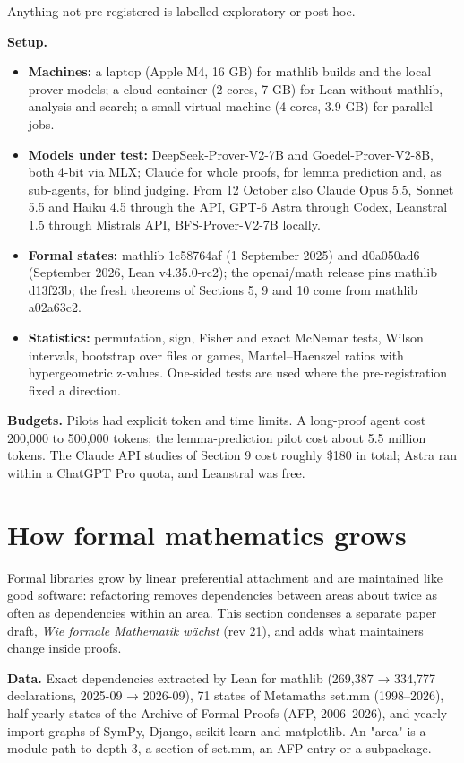 \documentclass[11pt,a4paper]{article}
\providecommand{\tightlist}{\setlength{\itemsep}{0pt}\setlength{\parskip}{0pt}}
\begin{document}
Anything not pre-registered is labelled exploratory or post hoc.

\textbf{Setup.}

\begin{itemize}
\tightlist
\item
  \textbf{Machines:} a laptop (Apple M4, 16 GB) for mathlib builds and the local prover models; a cloud container (2 cores, 7 GB) for Lean without mathlib, analysis and search; a small virtual machine (4 cores, 3.9 GB) for parallel jobs.
\item
  \textbf{Models under test:} DeepSeek-Prover-V2-7B and Goedel-Prover-V2-8B, both 4-bit via MLX; Claude for whole proofs, for lemma prediction and, as sub-agents, for blind judging. From 12 October also Claude Opus 5.5, Sonnet 5.5 and Haiku 4.5 through the API, GPT-6 Astra through Codex, Leanstral 1.5 through Mistral\textquotesingle s API, BFS-Prover-V2-7B locally.
\item
  \textbf{Formal states:} mathlib 1c58764af (1 September 2025) and d0a050ad6 (September 2026, Lean v4.35.0-rc2); the openai/math release pins mathlib d13f23b; the fresh theorems of Sections 5, 9 and 10 come from mathlib a02a63c2.
\item
  \textbf{Statistics:} permutation, sign, Fisher and exact McNemar tests, Wilson intervals, bootstrap over files or games, Mantel--Haenszel ratios with hypergeometric z-values. One-sided tests are used where the pre-registration fixed a direction.
\end{itemize}

\textbf{Budgets.} Pilots had explicit token and time limits. A long-proof agent cost 200,000 to 500,000 tokens; the lemma-prediction pilot cost about 5.5 million tokens. The Claude API studies of Section 9 cost roughly \$180 in total; Astra ran within a ChatGPT Pro quota, and Leanstral was free.

\section{How formal mathematics grows}

Formal libraries grow by linear preferential attachment and are maintained like good software: refactoring removes dependencies between areas about twice as often as dependencies within an area. This section condenses a separate paper draft, \emph{Wie formale Mathematik wächst} (rev 21), and adds what maintainers change inside proofs.

\textbf{Data.} Exact dependencies extracted by Lean for mathlib (269,387 → 334,777 declarations, 2025-09 → 2026-09), 71 states of Metamath\textquotesingle s set.mm (1998--2026), half-yearly states of the Archive of Formal Proofs (AFP, 2006--2026), and yearly import graphs of SymPy, Django, scikit-learn and matplotlib. An "area" is a module path to depth 3, a section of set.mm, an AFP entry or a subpackage.
\end{document}
